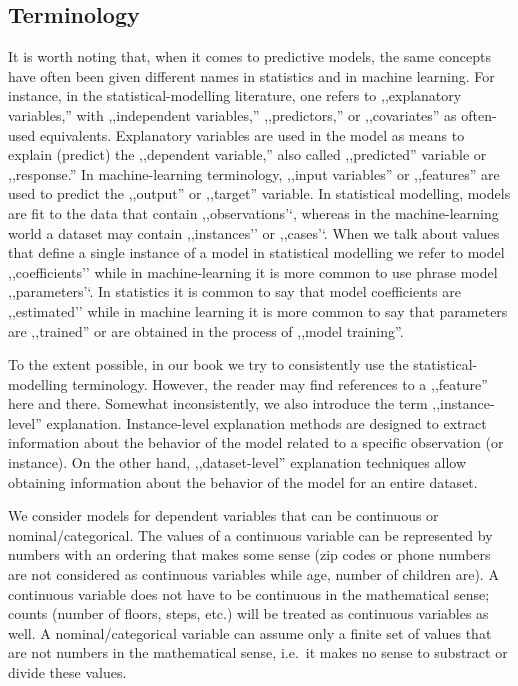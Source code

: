 \documentclass[12pt,]{krantz}
\begin{document}
\hypertarget{terminology}{%
\subsection{Terminology}\label{terminology}}

It is worth noting that, when it comes to predictive models, the same concepts have often been given different names in statistics and in machine learning. For instance, in the statistical-modelling literature, one refers to ,,explanatory variables,'' with ,,independent variables,'' ,,predictors,'' or ,,covariates'' as often-used equivalents. Explanatory variables are used in the model as means to explain (predict) the ,,dependent variable,'' also called ,,predicted'' variable or ,,response.'' In machine-learning terminology, ,,input variables'' or ,,features'' are used to predict the ,,output'' or ,,target'' variable. In statistical modelling, models are fit to the data that contain ,,observations'`, whereas in the machine-learning world a dataset may contain ,,instances'' or ,,cases'`. When we talk about values that define a single instance of a model in statistical modelling we refer to model ,,coefficients'' while in machine-learning it is more common to use phrase model ,,parameters'`. In statistics it is common to say that model coefficients are ,,estimated'' while in machine learning it is more common to say that parameters are ,,trained'' or are obtained in the process of ,,model training''.

To the extent possible, in our book we try to consistently use the statistical-modelling terminology. However, the reader may find references to a ,,feature'' here and there. Somewhat inconsistently, we also introduce the term ,,instance-level'' explanation. Instance-level explanation methods are designed to extract information about the behavior of the model related to a specific observation (or instance). On the other hand, ,,dataset-level'' explanation techniques allow obtaining information about the behavior of the model for an entire dataset.

We consider models for dependent variables that can be continuous or nominal/categorical. The values of a continuous variable can be represented by numbers with an ordering that makes some sense (zip codes or phone numbers are not considered as continuous variables while age, number of children are). A continuous variable does not have to be continuous in the mathematical sense; counts (number of floors, steps, etc.) will be treated as continuous variables as well. A nominal/categorical variable can assume only a finite set of values that are not numbers in the mathematical sense, i.e.~it makes no sense to substract or divide these values.
\end{document}

